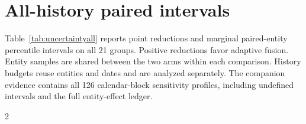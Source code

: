 \documentclass[pdflatex,iicol,sn-mathphys-num]{sn-jnl}
\begin{document}
\FloatBarrier
\section{All-history paired intervals}\label{app:uncertainty}

Table~\ref{tab:uncertaintyall} reports point reductions and marginal paired-entity percentile intervals on all 21 groups. Positive reductions favor adaptive fusion. Entity samples are shared between the two arms within each comparison. History budgets reuse entities and dates and are analyzed separately. The companion evidence contains all 126 calendar-block sensitivity profiles, including undefined intervals and the full entity-effect ledger.

\FloatBarrier
\clearpage
\backmatter
\onecolumn
\begin{multicols}{2}
\setlength{\bibsep}{0.25em}
\renewcommand{\bibfont}{\fontsize{9.5}{11.4}\selectfont}

\end{multicols}
\end{document}
